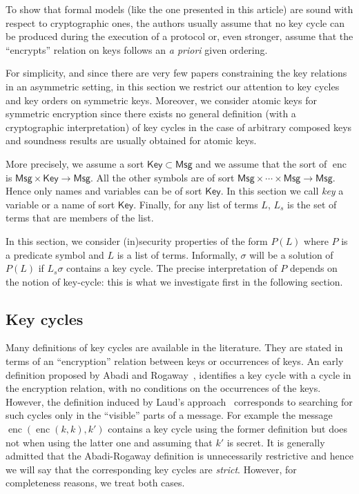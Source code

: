 \documentclass[acmtocl,acmnow]{acmtrans2m}
\newcommand{\penc}[2]{\operatorname{enc}(#1,#2)}
\newcommand{\enc}{\operatorname{enc}}
\newcommand{\term}{\mathsf{Msg}}
\newcommand{\keys}{\mathsf{Key}}
\newcommand{\lset}[1]{#1_s}
\begin{document}
To show that formal models (like the one presented in this article)
are sound with respect to cryptographic ones, the authors usually
assume that no key cycle can be produced during the execution of a
protocol or, even stronger, assume that the ``encrypts'' relation on keys
follows an \emph{a priori} given ordering.

For simplicity, and since there are very few papers constraining the key
relations in an asymmetric setting, in this section we restrict our attention to key cycles and key orders
on symmetric keys. Moreover, we consider atomic keys for symmetric encryption since
there exists no general definition (with a cryptographic interpretation) of key cycles in the case of arbitrary composed keys and soundness results are usually obtained for atomic keys.



More precisely, we assume a sort
$\keys\subset\term$ and we assume that the sort of $\enc$ is
$\term\times \keys \rightarrow \term$. All the other symbols are
of sort $\term\times \cdots \times \term \rightarrow \term$. Hence only names and variables can be of
sort $\keys$. In this section we call \emph{key} a variable or a name of sort $\keys$. Finally, for any list of terms $L$, $\lset{L}$ is the set of terms
that are members of the list.


















In this section, we consider (in)security properties of the form
$P(L)$ where $P$ is a predicate symbol and $L$ is a list of terms. Informally,
$\sigma$ will be a solution of $P(L)$ if $\lset{L}\sigma$ contains a key cycle.
The precise interpretation of $P$ depends on the notion of key-cycle:
this is what we investigate first in the following section.





\subsection{Key cycles}
Many definitions of key cycles are available in the literature. They
are stated in terms of an ``encryption'' relation between keys or
occurrences of keys.  An early definition proposed by Abadi and Rogaway~\cite{ARCryptology02},
identifies a key cycle with a cycle in the encryption relation, with
no conditions on the occurrences of the keys.
However, the definition induced by Laud's
approach~\cite{Laud-NORDSEC02} corresponds to searching for such
cycles only in the ``visible'' parts of a message. For example the
message $\penc{\penc{k}{k}}{k'}$ contains a key cycle using the former
definition but does not when using the latter one and assuming that
$k'$ is secret. It is generally admitted that the Abadi-Rogaway
definition is unnecessarily restrictive and hence we will say that the
corresponding key cycles are \emph{strict}. However, for completeness
reasons, we treat both cases.
\end{document}

